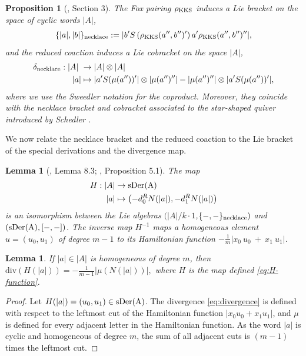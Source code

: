 \documentclass[a4paper,fleqn]{cas-sc}
\newtheorem{lemma}[theorem]{Lemma}
\newtheorem{proposition}[theorem]{Proposition}
\begin{document}
\begin{proposition}[\cite{ANR}, Section 3]
The Fox pairing $\rho_{\rm{KKS}}$ induces a Lie bracket on the space of cyclic words $|A|$, 
\begin{equation*}
\{|a|,|b|\}_{\rm{necklace}}:=|b'S\left(\rho_{\rm{KKS}}(a'',b'')'\right)a'\rho_{\rm{KKS}}(a'',b'')''|,
\end{equation*}
and the reduced coaction induces a Lie cobracket on the space $|A|$,
\begin{align*}
\delta_{\rm{necklace}}:|A|\ & \to |A|\otimes |A| \\ 
                            |a| & \mapsto |a'S(\mu(a''))'|\otimes |\mu(a'')''|-|\mu(a'')''|\otimes |a'S(\mu(a''))'|,
\end{align*} 
where we use the Sweedler notation for the coproduct.
Moreover, they coincide with the necklace bracket and cobracket associated to the star-shaped quiver introduced by Schedler \cite{Schedler2005}. 


\end{proposition}

We now relate the necklace bracket and the reduced coaction to the Lie bracket of the special derivations and the divergence map.

\begin{lemma}[\cite{GTgenus0}, Lemma 8.3; \cite{Goncharov2001}, Proposition 5.1] \label{lemma:hamiltonian}
The map 
\begin{equation} \label{eq:H-function}
    \begin{split}
        H: |A| & \to \rm{sDer}(A) \\ 
        |a| & \mapsto \left(-d^R_{0}N(|a|), -d^R_{1}N(|a|)\right)
    \end{split}
\end{equation}
is an isomorphism between the Lie algebras $(|A|/k\cdot 1$,$\{-,-\}_{\rm{necklace}})$ and $(\rm{sDer}(A),[-,-])$. The inverse map $H^{-1}$ maps a homogeneous element $u=(u_0,u_1)$ of degree $m-1$ to its Hamiltonian function $-\frac{1}{m}|x_0~u_0~+~x_1~u_1|$.
\end{lemma}

\begin{lemma}\label{lemma:div_mu}
	If $|a|\in |A|$ is homogeneous of degree $m$, then
	$
		\text{div}(H(|a|))=  -\frac{1}{m-1}| \mu(N(|a|))|,
	$ 
where $H$ is the map defined \eqref{eq:H-function}.
\end{lemma}

\begin{proof}
Let $H(|a|)=(u_0,u_1)\in \rm{sDer}(A)$.
The divergence \eqref{eq:divergence} is defined with respect to the leftmost cut of the Hamiltonian function $|x_0u_0+x_1u_1|$, and $\mu$ is defined for every adjacent letter in the Hamiltonian function. As the word $|a|$ is cyclic and homogeneous of degree $m$, the sum of all adjacent cuts is $(m-1)$ times the leftmost cut.
\end{proof}
\end{document}
